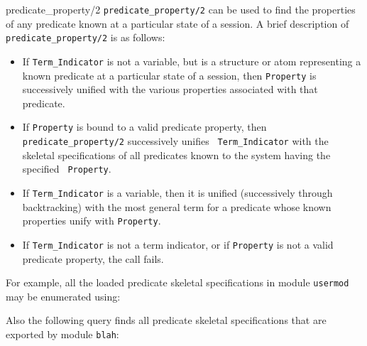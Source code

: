 \begin{description}
\label{PredProp}
        {predicate\_property/2} 
%
{\tt predicate\_property/2} can be used to find the properties of any
predicate known at a particular state of a session.  A brief
description of {\tt predicate\_property/2} is as follows:
%    
    \begin{itemize} 
\item If {\tt Term\_Indicator} is not a variable, but is a structure
  or atom representing a known predicate at a particular state of a
  session, then {\tt Property} is successively unified with the
  various properties associated with that predicate.
\item If {\tt Property} is bound to a valid predicate property, then {\tt
	predicate\_property/2} successively unifies {\tt
	Term\_Indicator} with the skeletal specifications of all
	predicates known to the system having the specified {\tt
	Property}.  
\item If {\tt Term\_Indicator} is a variable, then it is unified
  (successively through backtracking) with the most general term for a
  predicate whose known properties unify with {\tt Property}.
\item If {\tt Term\_Indicator}
	is not a term indicator, or if {\tt Property} is not a valid
	predicate property, the call fails.  
\end{itemize} 
\noindent
For example, all the loaded predicate skeletal specifications in
module {\tt usermod} may be enumerated using:


    Also the following query finds all predicate skeletal specifications that 
    are exported by module {\tt blah}:



\end{description}
